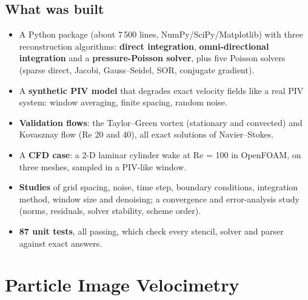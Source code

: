 \section{What was built}
\begin{itemize}
  \item A Python package (about 7\,500 lines, NumPy/SciPy/Matplotlib) with three reconstruction algorithms: \textbf{direct integration}, \textbf{omni-directional integration} and a \textbf{pressure-Poisson solver}, plus five Poisson solvers (sparse direct, Jacobi, Gauss--Seidel, SOR, conjugate gradient).
  \item A \textbf{synthetic PIV model} that degrades exact velocity fields like a real PIV system: window averaging, finite spacing, random noise.
  \item \textbf{Validation flows}: the Taylor--Green vortex (stationary and convected) and Kovasznay flow (Re 20 and 40), all exact solutions of Navier--Stokes.
  \item A \textbf{CFD case}: a 2-D laminar cylinder wake at Re = 100 in OpenFOAM, on three meshes, sampled in a PIV-like window.
  \item \textbf{Studies} of grid spacing, noise, time step, boundary conditions, integration method, window size and denoising; a convergence and error-analysis study (norms, residuals, solver stability, scheme order).
  \item \textbf{87 unit tests}, all passing, which check every stencil, solver and parser against exact answers.
\end{itemize}

\chapter{Particle Image Velocimetry}

